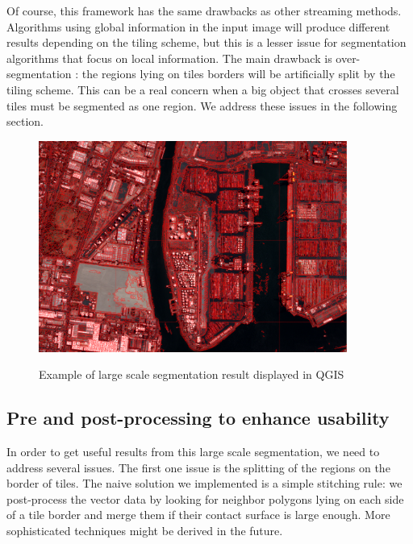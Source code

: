 \documentclass{josis}
\begin{document}
Of course, this framework has the same drawbacks as other streaming
methods. Algorithms using global information in the input image will
produce different results depending on the tiling scheme, but this is
a lesser issue for segmentation algorithms that focus on local
information.  The main drawback is over-segmentation : the regions
lying on tiles borders will be artificially split by the tiling
scheme. This can be a real concern when a big object that crosses
several tiles must be segmented as one region.  We address these
issues in the following section.

\begin{figure}[!htb]
\centering
\includegraphics[width=0.9\textwidth]{Pictures/ogrs_nostitch.png}\label{fig:nostitch}
\caption{Example of large scale segmentation result displayed in QGIS}
\end{figure}


\subsection{Pre and post-processing to enhance usability}

In order to get useful results from this large scale segmentation, we
need to address several issues. The first one issue is the splitting
of the regions on the border of tiles. The naive solution we
implemented is a simple stitching rule: we post-process the vector
data by looking for neighbor polygons lying on each side of a tile
border and merge them if their contact surface is large enough. More
sophisticated techniques might be derived in the future.
\end{document}
